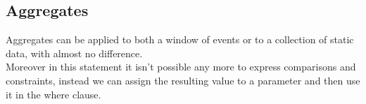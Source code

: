 \subsection{Aggregates}
Aggregates can be applied to both a window of events or to a collection of static data, with almost no difference.\\
Moreover in this statement it isn't possible any more to express comparisons and constraints, instead we can assign the resulting value to a parameter and then use it in the where clause.
\begin{bnf*}
\\
\\
\\
\\
\\
\\
\end{bnf*}

